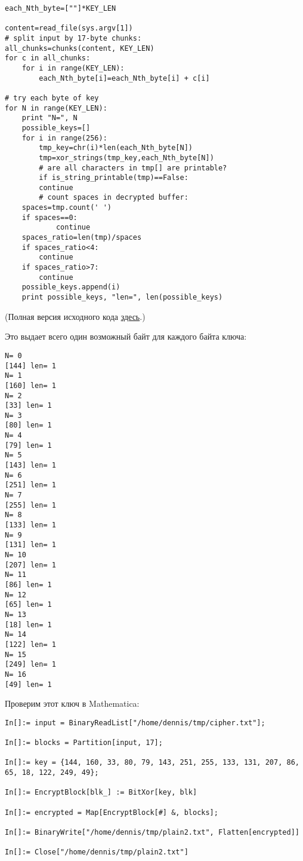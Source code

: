 \begin{lstlisting}[caption=Python script,style=custompy]
each_Nth_byte=[""]*KEY_LEN

content=read_file(sys.argv[1])
# split input by 17-byte chunks:
all_chunks=chunks(content, KEY_LEN)
for c in all_chunks:
    for i in range(KEY_LEN):
        each_Nth_byte[i]=each_Nth_byte[i] + c[i]

# try each byte of key
for N in range(KEY_LEN):
    print "N=", N
    possible_keys=[]
    for i in range(256):
        tmp_key=chr(i)*len(each_Nth_byte[N])
        tmp=xor_strings(tmp_key,each_Nth_byte[N])
        # are all characters in tmp[] are printable?
        if is_string_printable(tmp)==False:
	    continue
        # count spaces in decrypted buffer:
	spaces=tmp.count(' ')
	if spaces==0:
            continue
	spaces_ratio=len(tmp)/spaces
	if spaces_ratio<4:
	    continue
	if spaces_ratio>7:
	    continue
	possible_keys.append(i)
    print possible_keys, "len=", len(possible_keys)
\end{lstlisting}

(Полная версия исходного кода \href{\RepoURL/ff/XOR/mask_2/files/decrypt3.py}{здесь}.)

Это выдает всего один возможный байт для каждого байта ключа:

\begin{lstlisting}
N= 0
[144] len= 1
N= 1
[160] len= 1
N= 2
[33] len= 1
N= 3
[80] len= 1
N= 4
[79] len= 1
N= 5
[143] len= 1
N= 6
[251] len= 1
N= 7
[255] len= 1
N= 8
[133] len= 1
N= 9
[131] len= 1
N= 10
[207] len= 1
N= 11
[86] len= 1
N= 12
[65] len= 1
N= 13
[18] len= 1
N= 14
[122] len= 1
N= 15
[249] len= 1
N= 16
[49] len= 1
\end{lstlisting}

Проверим этот ключ в Mathematica:

\begin{lstlisting}[caption=Mathematica,style=custommath]
In[]:= input = BinaryReadList["/home/dennis/tmp/cipher.txt"];

In[]:= blocks = Partition[input, 17];

In[]:= key = {144, 160, 33, 80, 79, 143, 251, 255, 133, 131, 207, 86, 65, 18, 122, 249, 49};

In[]:= EncryptBlock[blk_] := BitXor[key, blk]

In[]:= encrypted = Map[EncryptBlock[#] &, blocks];

In[]:= BinaryWrite["/home/dennis/tmp/plain2.txt", Flatten[encrypted]]

In[]:= Close["/home/dennis/tmp/plain2.txt"]
\end{lstlisting}

